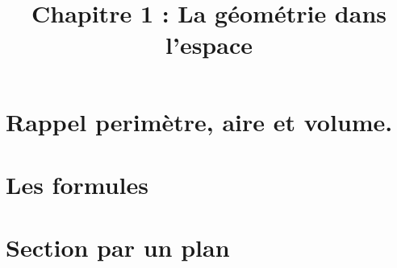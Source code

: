 \title{\vspace{-3em}Chapitre 1 : La géométrie dans l'espace\vspace{-4em}}%
\date{ }
\maketitle


\section{Rappel perimètre, aire et volume.}



\section{Les formules}



\section{Section par un plan}


